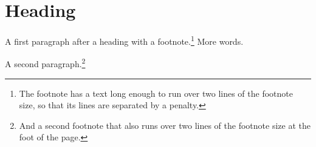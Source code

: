 \documentclass{article}
\begin{document}
\section{Heading}
A first paragraph after a heading with a footnote.\footnote{The footnote has a text long enough to run over two lines of the footnote size, so that its lines are separated by a penalty.} More words.

A second paragraph.\footnote{And a second footnote that also runs over two lines of the footnote size at the foot of the page.}
\end{document}
